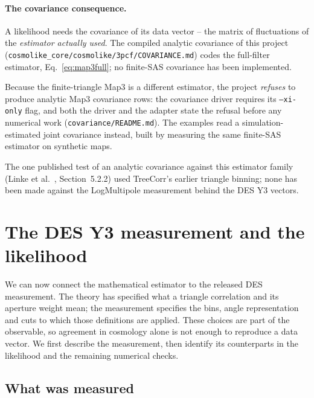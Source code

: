 \documentclass[11pt]{article}
\newcommand{\us}{\_\allowbreak}
\numberwithin{equation}{section}
\begin{document}
\paragraph{The covariance consequence.}
A likelihood needs the covariance of its data vector -- the matrix of
fluctuations of the \emph{estimator actually used}.  The compiled
analytic covariance of this project
(\texttt{cosmolike\us core/cosmolike/3pcf/COVARIANCE.md}) codes the
full-filter estimator, Eq.~\eqref{eq:map3full}; no finite-SAS
covariance has been implemented.

Because the finite-triangle Map3 is a different estimator, the
project \emph{refuses} to produce analytic Map3 covariance rows: the
covariance driver requires its \texttt{--xi-only} flag, and both the
driver and the adapter state the refusal before any numerical work
(\texttt{covariance/README.md}).  The examples read a
simulation-estimated joint covariance instead, built by measuring
the same finite-SAS estimator on synthetic maps.

The one published test of an analytic covariance against this
estimator family (Linke et al.~\cite{Linke}, Section~5.2.2) used
TreeCorr's earlier triangle binning; none has been made against the
LogMultipole measurement behind the DES Y3 vectors.

\section{The DES Y3 measurement and the likelihood}
\label{sec:likelihood}

We can now connect the mathematical estimator to the released DES
measurement. The theory has specified what a triangle correlation and
its aperture weight mean; the measurement specifies the bins, angle
representation and cuts to which those definitions are applied. These
choices are part of the observable, so agreement in cosmology alone is
not enough to reproduce a data vector. We first describe the measurement,
then identify its counterparts in the likelihood and the remaining
numerical checks.

\subsection{What was measured}
\label{sec:measurement}
\end{document}
